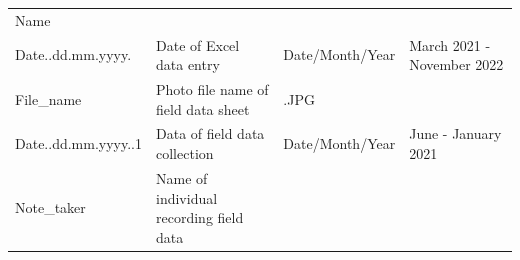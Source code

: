 \documentclass[
  12pt,
]{article}
\begin{document}
\begin{longtable}[]{@{}llll@{}}
\begin{minipage}[t]{0.18\columnwidth}
Name\strut
\end{minipage} & \begin{minipage}[t]{0.18\columnwidth}\raggedright
\strut
\end{minipage}\tabularnewline
\begin{minipage}[t]{0.18\columnwidth}\raggedright
Date..dd.mm.yyyy.\strut
\end{minipage} & \begin{minipage}[t]{0.35\columnwidth}\raggedright
Date of Excel data entry\strut
\end{minipage} & \begin{minipage}[t]{0.18\columnwidth}\raggedright
Date/Month/Year\strut
\end{minipage} & \begin{minipage}[t]{0.18\columnwidth}\raggedright
March 2021 - November 2022\strut
\end{minipage}\tabularnewline
\begin{minipage}[t]{0.18\columnwidth}\raggedright
File\_name\strut
\end{minipage} & \begin{minipage}[t]{0.35\columnwidth}\raggedright
Photo file name of field data sheet\strut
\end{minipage} & \begin{minipage}[t]{0.18\columnwidth}\raggedright
.JPG\strut
\end{minipage} & \begin{minipage}[t]{0.18\columnwidth}\raggedright
\strut
\end{minipage}\tabularnewline
\begin{minipage}[t]{0.18\columnwidth}\raggedright
Date..dd.mm.yyyy..1\strut
\end{minipage} & \begin{minipage}[t]{0.35\columnwidth}\raggedright
Data of field data collection\strut
\end{minipage} & \begin{minipage}[t]{0.18\columnwidth}\raggedright
Date/Month/Year\strut
\end{minipage} & \begin{minipage}[t]{0.18\columnwidth}\raggedright
June - January 2021\strut
\end{minipage}\tabularnewline
\begin{minipage}[t]{0.18\columnwidth}\raggedright
Note\_taker\strut
\end{minipage} & \begin{minipage}[t]{0.35\columnwidth}\raggedright
Name of individual recording field data\strut

\end{minipage}
\end{longtable}
\end{document}
